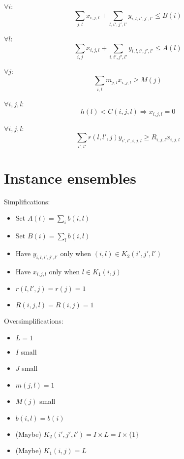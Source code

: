 \documentclass{article}
\begin{document}
$\forall i$:
\begin{equation}
\sum_{j, l} x_{i,j,l} + \sum_{l, i', j', l'} y_{i, l, i', j', l'} \leq B(i)
\end{equation}

$\forall l$:
\begin{equation}
\sum_{i, j} x_{i, j, l} + \sum_{i, i', j', l'} y_{i, l, i', j', l'} \leq A(l)
\end{equation}

$ \forall j$:
\begin{equation}
\sum_{i, l} m_{j, l} x_{i, j, l} \geq M(j) 
\end{equation}

$\forall i, j, l$:
\begin{equation}
h(l) < C(i, j, l) \Rightarrow x_{i, j, l} = 0
\end{equation}

$\forall i, j, l$:
\begin{equation}
\sum_{i', l'} r(l, l', j) y_{i', l', i, j, l} \geq R_{i, j, l} x_{i, j, l}
\end{equation}

\section{Instance ensembles}
Simplifications:
\begin{itemize}
    \item Set $A(l) = \sum_{i} b(i, l)$
    \item Set $B(i) = \sum_{l} b(i, l)$
    \item Have $y_{i,l,i',j',l'}$ only when $(i, l) \in K_2(i', j', l')$
    \item Have $x_{i, j, l}$ only when $l \in K_1(i, j)$
    \item $r(l, l', j) = r(j) = 1$
    \item $R(i, j, l) = R(i, j) = 1$
\end{itemize}

\noindent
Oversimplifications:
\begin{itemize}
\item $L = 1$
\item $I$ small
\item $J$ small
\item $m(j, l) = 1$
\item $M(j)$ small 
\item $b(i, l) = b(i)$
\item (Maybe) $K_2(i', j', l') = I \times L = I \times \{1\}$
\item (Maybe) $K_1(i, j) = L$
\end{itemize}
\end{document}
